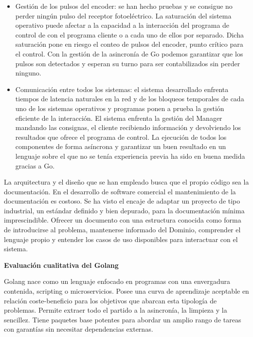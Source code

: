 \begin{itemize}
    \item Gestión de los pulsos del encoder: se han hecho pruebas y se consigue no perder ningún pulso del receptor fotoeléctrico.
    La saturación del sistema operativo puede afectar a la capacidad a la interacción del programa de control de con el programa cliente o a cada uno de ellos por separado.
    Dicha saturación pone en riesgo el conteo de pulsos del encoder, punto crítico para el control.
    Con la gestión de la asincronía de Go podemos garantizar que los pulsos son detectados y esperan su turno para ser contabilizados sin perder ninguno.
    \item Comunicación entre todos los sistemas: el sistema desarrollado enfrenta tiempos de latencia naturales en la red y de los bloqueos temporales de cada uno de los sistemas operativos y programas ponen a prueba la gestión eficiente de la interacción.
    El sistema enfrenta la gestión del Manager mandando las consignas, el cliente recibiendo información y devolviendo los resultados que ofrece el programa de control.
    La ejecución de todos los componentes de forma asíncrona y garantizar un buen resultado en un lenguaje sobre el que no se tenía experiencia previa ha sido en buena medida gracias a Go.
\end{itemize}

La arquitectura y el diseño que se han empleado busca que el propio código sea la documentación.
En el desarrollo de software comercial el mantenimiento de la documentación es costoso.
Se ha visto el encaje de adaptar un proyecto de tipo industrial, un estándar definido y bien depurado, para la documentación mínima imprescindible.
Ofrecer un documento con una estructura conocida como forma de introducirse al problema, mantenerse informado del Dominio, comprender el lenguaje propio y entender los casos de uso disponibles para interactuar con el sistema.
%

\textbf{Evaluación cualitativa del Golang}

Golang nace como un lenguaje enfocado en programas con una envergadura contenida, scripting o microservicios.
Posee una curva de aprendizaje aceptable en relación coste-beneficio para los objetivos que abarcan esta tipología de problemas.
Permite extraer todo el partido a la asincronía, la limpieza y la sencillez.
Tiene paquetes base potentes para abordar un amplio rango de tareas con garantías sin necesitar dependencias externas.

